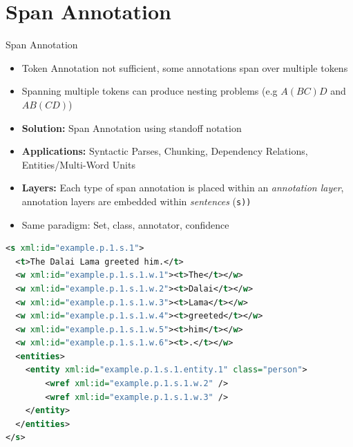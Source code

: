\documentclass[compress]{beamer}
\begin{document}
\section{Span Annotation}


        
\begin{frame}
    \begin{block}{Span Annotation}
        \begin{itemize}
            \item Token Annotation not sufficient, some annotations span over multiple tokens
            \item Spanning multiple tokens can produce nesting problems (e.g $A (B C) D$ and $A B (C D)$)                
            \item \textbf{Solution:} Span Annotation using standoff notation
            \item \textbf{Applications:} Syntactic Parses, Chunking, Dependency Relations, Entities/Multi-Word Units
            \item \textbf{Layers:} Each type of span annotation is placed within an \emph{annotation layer}, annotation layers are embedded within \emph{sentences} (\texttt{s))}
            \item Same paradigm: Set, class, annotator, confidence
        \end{itemize}        
    \end{block}
\end{frame}

\begin{frame}[fragile]


\begin{lstlisting}[language=xml]
<s xml:id="example.p.1.s.1">
  <t>The Dalai Lama greeted him.</t>
  <w xml:id="example.p.1.s.1.w.1"><t>The</t></w>
  <w xml:id="example.p.1.s.1.w.2"><t>Dalai</t></w>
  <w xml:id="example.p.1.s.1.w.3"><t>Lama</t></w>
  <w xml:id="example.p.1.s.1.w.4"><t>greeted</t></w>
  <w xml:id="example.p.1.s.1.w.5"><t>him</t></w>
  <w xml:id="example.p.1.s.1.w.6"><t>.</t></w>
  <entities>
    <entity xml:id="example.p.1.s.1.entity.1" class="person">
        <wref xml:id="example.p.1.s.1.w.2" />
        <wref xml:id="example.p.1.s.1.w.3" />
    </entity>
  </entities>
</s>
\end{lstlisting}                    

\end{frame}
\end{document}
